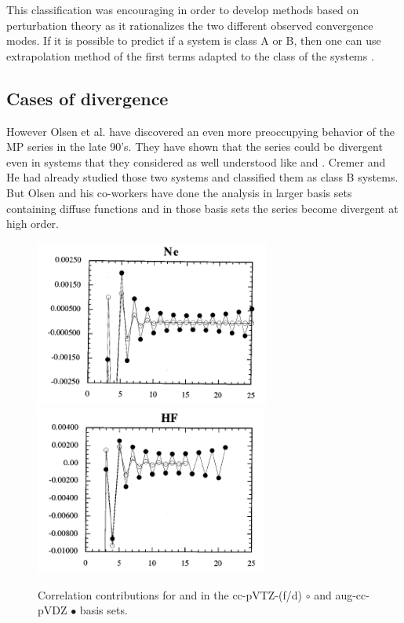 \documentclass[11pt,a4paper]{article}
\begin{document}
{This classification was encouraging in order to develop methods based on perturbation theory as it rationalizes the two different observed convergence modes. If it is possible to predict if a system is class A or B, then one can use extrapolation method of the first terms adapted to the class of the systems \cite{Cremer_1996}.

\subsection{Cases of divergence}

However Olsen et al. have discovered an even more preoccupying behavior of the MP series in the late 90's. They have shown that the series could be divergent even in systems that they considered as well understood like  and  \cite{Olsen_1996, Christiansen_1996}. Cremer and He had already studied those two systems and classified them as class B systems. But Olsen and his co-workers have done the analysis in larger basis sets containing diffuse functions and in those basis sets the series become divergent at high order.

\begin{figure}[h!]
    \includegraphics[height=5.5cm]{Nedivergence.png}
    \hfill
    \includegraphics[height=5.5cm]{HFdivergence.png}
    \hfill
    \caption{\centering Correlation contributions for  and  in the cc-pVTZ-(f/d) $\circ$ and aug-cc-pVDZ $\bullet$ basis sets.}
    \label{fig:my_label}
\end{figure}

}
\end{document}
